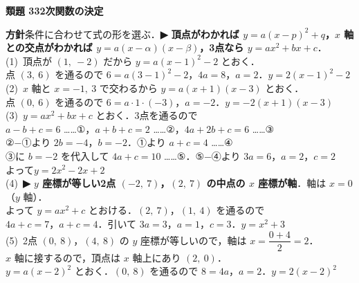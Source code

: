 \documentclass[a4paper,11pt]{ltjsarticle}
\newcommand{\ans}[2]{\Needspace{5\baselineskip}\vspace{6pt}%
  {\sffamily\bfseries 類題 #1\quad #2}\par}
\newcommand{\point}[1]{\textsf{\bfseries ▶ #1}}
\begin{document}
\ans{33}{2次関数の決定}
\begin{kai}
\textbf{方針}\quad 条件に合わせて式の形を選ぶ．\point{頂点がわかれば $y=a(x-p)^2+q$，$x$ 軸との交点がわかれば $y=a(x-\alpha)(x-\beta)$，3点なら $y=ax^2+bx+c$}．\\[2pt]
(1)\ 頂点が $(1,\ -2)$ だから $y=a(x-1)^2-2$ とおく．\\
\hspace*{1.5em}点 $(3,\ 6)$ を通るので $6=a(3-1)^2-2$，\quad $4a=8$，\quad $a=2$．\quad $y=2(x-1)^2-2$\\[2pt]
(2)\ $x$ 軸と $x=-1,\ 3$ で交わるから $y=a(x+1)(x-3)$ とおく．\\
\hspace*{1.5em}点 $(0,\ 6)$ を通るので $6=a\cdot1\cdot(-3)$，\quad $a=-2$．\quad $y=-2(x+1)(x-3)$\\[2pt]
(3)\ $y=ax^2+bx+c$ とおく．3点を通るので\\
\hspace*{1.5em}$a-b+c=6$ ……①，\quad $a+b+c=2$ ……②，\quad $4a+2b+c=6$ ……③\\
\hspace*{1.5em}②$-$①より $2b=-4$，$b=-2$．①より $a+c=4$ ……④\\
\hspace*{1.5em}③に $b=-2$ を代入して $4a+c=10$ ……⑤．\quad ⑤$-$④より $3a=6$，$a=2$，$c=2$\\
\hspace*{1.5em}よって\quad $y=2x^2-2x+2$\\[2pt]
(4)\ \point{$y$ 座標が等しい2点 $(-2,\ 7)$，$(2,\ 7)$ の中点の $x$ 座標が軸}．軸は $x=0$（$y$ 軸）．\\
\hspace*{1.5em}よって $y=ax^2+c$ とおける．$(2,\ 7)$，$(1,\ 4)$ を通るので\\
\hspace*{1.5em}$4a+c=7$，\quad $a+c=4$．\quad 引いて $3a=3$，$a=1$，$c=3$．\quad $y=x^2+3$\\[2pt]
(5)\ 2点 $(0,\ 8)$，$(4,\ 8)$ の $y$ 座標が等しいので，軸は $x=\dfrac{0+4}{2}=2$．\\
\hspace*{1.5em}$x$ 軸に接するので，頂点は $x$ 軸上にあり $(2,\ 0)$．\\
\hspace*{1.5em}$y=a(x-2)^2$ とおく．$(0,\ 8)$ を通るので $8=4a$，$a=2$．\quad $y=2(x-2)^2$
\end{kai}
\end{document}
